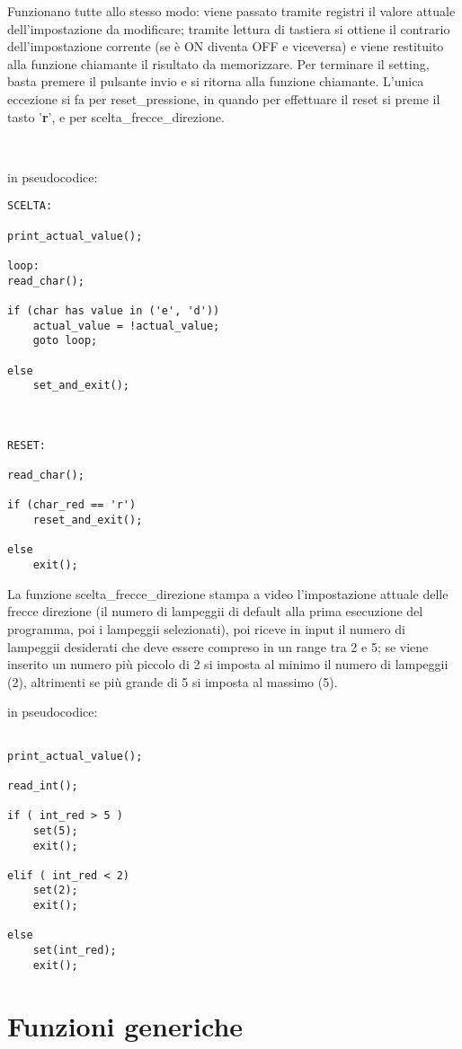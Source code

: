 \documentclass[a4paper,titlepage]{book}
\begin{document}
Funzionano tutte allo stesso modo: viene passato tramite registri il valore attuale dell'impostazione da modificare; tramite lettura di tastiera si ottiene il contrario dell'impostazione corrente (se è ON diventa OFF e viceversa) e viene restituito alla funzione chiamante il risultato da memorizzare. Per terminare il setting, basta premere il pulsante invio e si ritorna alla funzione chiamante. L'unica eccezione si fa per reset\_pressione, in quando per effettuare il reset si preme il tasto '\textbf{r}', e per scelta\_frecce\_direzione.

~

in pseudocodice:

\begin{lstlisting}
SCELTA:

print_actual_value();

loop:
read_char();

if (char has value in ('e', 'd'))
	actual_value = !actual_value;
	goto loop;

else
	set_and_exit();



RESET:

read_char();

if (char_red == 'r')
	reset_and_exit();

else
	exit();

\end{lstlisting}

La funzione scelta\_frecce\_direzione stampa a video l'impostazione attuale delle frecce direzione (il numero di lampeggii di default alla prima esecuzione del programma, poi i lampeggii selezionati), poi riceve in input il numero di lampeggii desiderati che deve essere compreso in un range tra 2 e 5; se viene inserito un numero più piccolo di 2 si imposta al minimo il numero di lampeggii (2), altrimenti se più grande di 5 si imposta al massimo (5).

in pseudocodice:

\begin{lstlisting}

print_actual_value();

read_int();

if ( int_red > 5 )
	set(5);
	exit();

elif ( int_red < 2)
	set(2);
	exit();

else
	set(int_red);
	exit();

\end{lstlisting}


\chapter{Funzioni generiche}
\end{document}
